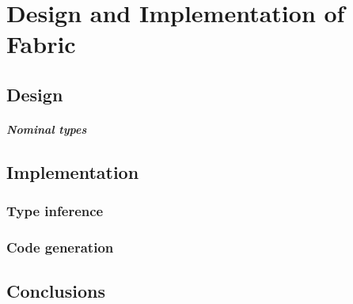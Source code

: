 \chapter{Design and Implementation of Fabric}
\label{fabric}

\section{Design}

\cite{mlstruct, forsythe, pizza-java}

\paragraph{Nominal types} \cite{integrating-nominal-and-structural, structural-refinement-types}

\section{Implementation}

\subsection{Type inference} 

\subsection{Code generation} 

\cite{remy-extensible-records}

\section{Conclusions}
